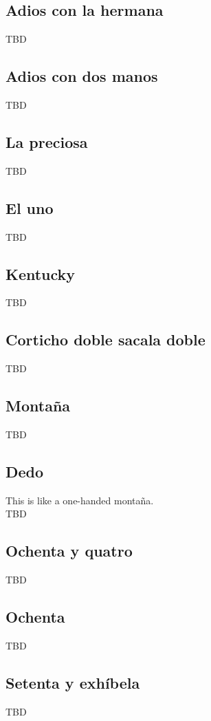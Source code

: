 \subsection{Adios con la hermana}
TBD

\subsection{Adios con dos manos}
TBD

\subsection{La preciosa}
TBD

\subsection{El uno}
TBD

\subsection{Kentucky}
TBD

\subsection{Corticho doble sacala doble}
TBD

\subsection{Monta\~{n}a}
TBD

\subsection{Dedo}
This is like a one-handed monta\~{n}a.\\
TBD

\subsection{Ochenta y quatro}
TBD

\subsection{Ochenta}
TBD

\subsection{Setenta y exh\'{i}bela}
TBD

